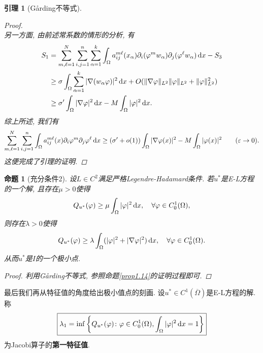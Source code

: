 \documentclass[12pt,a4paper]{article}
\newtheorem{proposition}[theorem]{命题}
\newtheorem{lemma}[theorem]{引理}
\begin{document}
\begin{lemma}[G\r arding不等式]
\begin{proof}
\begin{equation*}
        \end{equation*}
        另一方面, 由前述常系数的情形的分析, 有 
        \begin{align*}
            S_1 &= \sum_{m, \ell = 1}^N\sum_{i, j = 1}^n\sum_{\alpha = 1}^k\int_{\Omega}a_{ij}^{m\ell}(x_{\alpha})\partial_i(\varphi^mw_{\alpha})\partial_j(\varphi^\ell w_{\alpha}) \,{\rm d}x - S_3 \\ 
            &\geq \sigma\int_{\Omega}\sum_{\alpha = 1}^k|\nabla(w_{\alpha}\varphi)|^2 \,{\rm d}x + O(\Vert \nabla \varphi\Vert_{L^2}\Vert \varphi \Vert_{L^2} + \Vert \varphi \Vert_{L^2}^2) \\  
            &\geq \sigma'\int_{\Omega}|\nabla\varphi|^2 \,{\rm d}x - M\int_{\Omega}|\varphi|^2 \,{\rm d}x.
        \end{align*}
        综上所述, 我们有 
        \begin{equation*}
            \sum_{m, \ell = 1}^N\sum_{i, j = 1}^n\int_{\Omega}a_{ij}^{m\ell}(x)\partial_i\varphi^m\partial_j\varphi^\ell \,{\rm d}x \geq (\sigma'+ o(1))\int_{\Omega}|\nabla\varphi(x)|^2 - M\int_{\Omega}|\varphi(x)|^2  \qquad (\varepsilon \rightarrow 0).
        \end{equation*}
        这便完成了引理的证明.
    \end{proof}
\end{lemma}

\begin{proposition}[充分条件2]
    设$L \in C^2$满足严格Legendre-Hadamard条件. 若$u^*$是E-L方程的一个解, 且存在$\mu > 0$使得 
    \begin{equation*}
        Q_{u^*}(\varphi) \geq \mu\int_{\Omega}|\varphi|^2 \,{\rm d}x, \quad \forall \varphi \in C_0^1(\Omega),
    \end{equation*}
    则存在$\lambda > 0$使得 
    \begin{equation*}
        Q_{u^*}(\varphi) \geq \lambda\int_{\Omega}(|\varphi|^2 + |\nabla\varphi|^2) \,{\rm d}x, \quad \forall\varphi \in C_0^1(\Omega).
    \end{equation*}
    从而$u^*$是$I$的一个极小点.
    \begin{proof}
        利用G\r arding不等式, 参照命题\ref{prop1.14}的证明过程即可.
    \end{proof}
\end{proposition}

最后我们再从特征值的角度给出极小值点的刻画. 设$u^* \in C^1(\overline{\Omega})$是E-L方程的解. 称 
\begin{equation*}
    \boxed{\lambda_1 = \inf\left\{Q_{u^*}(\varphi)\colon \varphi \in C_0^1(\Omega), \int_{\Omega}|\varphi|^2 \,{\rm d}x = 1\right\}}
\end{equation*}
为Jacobi算子的\textbf{第一特征值}.
\end{document}
